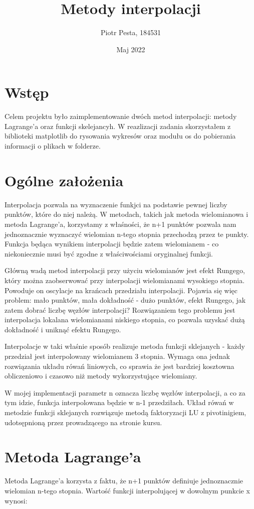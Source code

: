 \documentclass[fleqn]{article}
\title{Metody interpolacji}
\author{Piotr Pesta, 184531}
\date{Maj 2022}
\begin{document}
\maketitle


\section{Wstęp}
    Celem projektu było zaimplementowanie dwóch metod interpolacji: metody Lagrange'a oraz funkcji skelejancyh.
    W reazlizacji zadania skorzystałem z biblioteki matplotlib do rysowania wykresów oraz modułu os do pobierania informacji o plikach w folderze.

\section{Ogólne założenia}
    Interpolacja pozwala na wyznaczenie funkjci na podstawie pewnej liczby punktów, które do niej należą. W metodach, takich jak metoda wielomianowa i
    metoda Lagrange'a, korzystamy z właśności, że n+1 punktów pozwala nam jednoznacznie wyznaczyć wielomian n-tego stopnia przechodzą przez te
    punkty. Funkcja będąca wynikiem interpolacji będzie zatem wielomianem - co niekoniecznie musi być zgodne z właściwościami oryginalnej funkcji.

    \noindent Główną wadą metod interpolacji przy użyciu wielomianów jest efekt Rungego, który można zaobserwować przy interpolacji wielomianami wysokiego stopnia.
    Powoduje on oscylacje na krańcach przedziału interpolacji. Pojawia się więc problem: mało punktów, mała dokładność - dużo punktów, efekt Rungego, jak zatem dobrać liczbę węzłów interpolacji?
    Rozwiązaniem tego problemu jest interpolacja lokalana wielomianami niskiego stopnia, co pozwala uzyskać dużą dokładność i uniknąć efektu Rungego.

    \noindent Interpolacje w taki właśnie sposób realizuje metoda funkcji sklejanych - każdy przedział jest interpolowany wielomianem 3 stopnia. 
    Wymaga ona jednak rozwiązania układu rówań liniowych, co sprawia że jest bardziej kosztowna obliczeniowo i czasowo niż metody wykorzystujące 
    wielomiany.
    
    \noindent W mojej implementacji parametr n oznacza liczbę węzłów interpolacji, a co za tym idzie, funkcja interpolowana będzie w n-1 przedziłach.
    Układ rówań w metodzie funkcji sklejanych rozwiązuje metodą faktoryzacji LU z pivotinigiem, udotsępnioną przez prowadzącego na stronie kursu.
\section{Metoda Lagrange'a}
    Metoda Lagrange'a korzysta z faktu, że n+1 punktów definiuje jednoznacznie wielomian n-tego stopnia. 
    Wartość funkcji interpolującej w dowolnym punkcie x wynosi:
\end{document}
